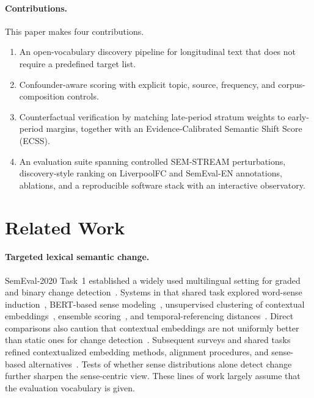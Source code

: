 \documentclass{llncs}
\begin{document}
\paragraph{Contributions.}
This paper makes four contributions.
\begin{enumerate}
\item An open-vocabulary discovery pipeline for longitudinal text that does not require a predefined target list.
\item Confounder-aware scoring with explicit topic, source, frequency, and corpus-composition controls.
\item Counterfactual verification by matching late-period stratum weights to early-period margins, together with an Evidence-Calibrated Semantic Shift Score (ECSS).
\item An evaluation suite spanning controlled SEM-STREAM perturbations, discovery-style ranking on LiverpoolFC and SemEval-EN annotations, ablations, and a reproducible software stack with an interactive observatory.
\end{enumerate}

\section{Related Work}
\label{sec:related}

\paragraph{Targeted lexical semantic change.}
SemEval-2020 Task~1 established a widely used multilingual setting for graded and binary change detection~\cite{schlechtweg2020semeval}.
Systems in that shared task explored word-sense induction~\cite{arefyev2020bos}, BERT-based sense modeling~\cite{beck2020diasense}, unsupervised clustering of contextual embeddings~\cite{cuba2020sensecluster,rother2020cmce}, ensemble scoring~\cite{gruppi2020schme}, and temporal-referencing distances~\cite{zhou2020temporalteller}.
Direct comparisons also caution that contextual embeddings are not uniformly better than static ones for change detection~\cite{martinc2020discovery}.
Subsequent surveys and shared tasks refined contextualized embedding methods, alignment procedures, and sense-based alternatives~\cite{tahmasebi2021survey,kutuzov2018diachronic}.
Tests of whether sense distributions alone detect change~\cite{tang2023cansense} further sharpen the sense-centric view.
These lines of work largely assume that the evaluation vocabulary is given.
\end{document}
